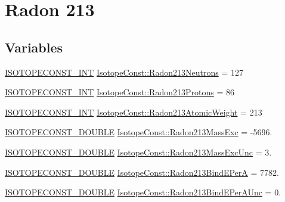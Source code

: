 \hypertarget{group___isotope_const-_radon-_rn213}{}\section{Radon 213}
\label{group___isotope_const-_radon-_rn213}
\subsection*{Variables}
\begin{DoxyCompactItemize}
\item 
\mbox{\hyperlink{group___isotope_const-_macros_ga5f18360b3e99483a35c32d789e62621c}{I\+S\+O\+T\+O\+P\+E\+C\+O\+N\+S\+T\+\_\+\+I\+NT}} \mbox{\hyperlink{group___isotope_const-_radon-_rn213_gaae2b88ca2604ce43ff69ec151e8ffb5c}{Isotope\+Const\+::\+Radon213\+Neutrons}} = 127
\item 
\mbox{\hyperlink{group___isotope_const-_macros_ga5f18360b3e99483a35c32d789e62621c}{I\+S\+O\+T\+O\+P\+E\+C\+O\+N\+S\+T\+\_\+\+I\+NT}} \mbox{\hyperlink{group___isotope_const-_radon-_rn213_ga0533143cfefee18deee7688be164bba7}{Isotope\+Const\+::\+Radon213\+Protons}} = 86
\item 
\mbox{\hyperlink{group___isotope_const-_macros_ga5f18360b3e99483a35c32d789e62621c}{I\+S\+O\+T\+O\+P\+E\+C\+O\+N\+S\+T\+\_\+\+I\+NT}} \mbox{\hyperlink{group___isotope_const-_radon-_rn213_ga8e53006a97ef742d435bea70109ade5e}{Isotope\+Const\+::\+Radon213\+Atomic\+Weight}} = 213
\item 
\mbox{\hyperlink{group___isotope_const-_macros_ga8f45a7272ce02c0b4c65c44636ed719a}{I\+S\+O\+T\+O\+P\+E\+C\+O\+N\+S\+T\+\_\+\+D\+O\+U\+B\+LE}} \mbox{\hyperlink{group___isotope_const-_radon-_rn213_ga8fd4dec502fd3ebe78403333fdc0f279}{Isotope\+Const\+::\+Radon213\+Mass\+Exc}} = -\/5696.
\item 
\mbox{\hyperlink{group___isotope_const-_macros_ga8f45a7272ce02c0b4c65c44636ed719a}{I\+S\+O\+T\+O\+P\+E\+C\+O\+N\+S\+T\+\_\+\+D\+O\+U\+B\+LE}} \mbox{\hyperlink{group___isotope_const-_radon-_rn213_ga5ca3d1d332866d0ec3239fdc9c23de10}{Isotope\+Const\+::\+Radon213\+Mass\+Exc\+Unc}} = 3.
\item 
\mbox{\hyperlink{group___isotope_const-_macros_ga8f45a7272ce02c0b4c65c44636ed719a}{I\+S\+O\+T\+O\+P\+E\+C\+O\+N\+S\+T\+\_\+\+D\+O\+U\+B\+LE}} \mbox{\hyperlink{group___isotope_const-_radon-_rn213_ga5663dccc4bdefeb9166d91fc0e94c20e}{Isotope\+Const\+::\+Radon213\+Bind\+E\+PerA}} = 7782.
\item 
\mbox{\hyperlink{group___isotope_const-_macros_ga8f45a7272ce02c0b4c65c44636ed719a}{I\+S\+O\+T\+O\+P\+E\+C\+O\+N\+S\+T\+\_\+\+D\+O\+U\+B\+LE}} \mbox{\hyperlink{group___isotope_const-_radon-_rn213_ga79522dd4d5a9618a5400d06187a079fb}{Isotope\+Const\+::\+Radon213\+Bind\+E\+Per\+A\+Unc}} = 0.

\end{DoxyCompactItemize}
